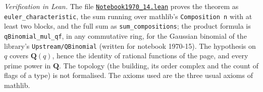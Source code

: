 \emph{Verification in Lean.} The file \href{\leanblobmain/Notebook1970_14.lean}{\texttt{Notebook1970\_14.\allowbreak{}lean}} proves the theorem as \texttt{euler\_characteristic}, the sum running over mathlib's \texttt{Composition n} with at least two blocks, and the full sum as \texttt{sum\_compositions}; the product formula is \texttt{qBinomial\_mul\_qf}, in any commutative ring, for the Gaussian binomial of the library's \texttt{Upstream/QBinomial} (written for notebook 1970-15). The hypothesis on $q$ covers $\mathbf Q(q)$, hence the identity of rational functions of the page, and every prime power in $\mathbf Q$. The topology (the building, its order complex and the count of flags of a type) is not formalised. The axioms used are the three usual axioms of mathlib.

